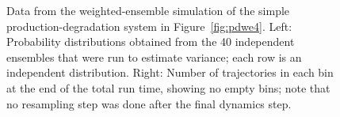 \documentclass[english,letterpaper,12pt]{report}
\begin{document}
\begin{doublespacing}
\begin{figure}[t]
    \caption{Data from the weighted-ensemble simulation of the simple production-degradation system in Figure~\ref{fig:pdwe4}. Left: Probability distributions obtained from the 40 independent ensembles that were run to estimate variance; each row is an independent distribution. Right: Number of trajectories in each bin at the end of the total run time, showing no empty bins; note that no resampling step was done after the final dynamics step.}
    \label{fig:pdwe4-data}
\end{figure}


\end{doublespacing}
\end{document}
